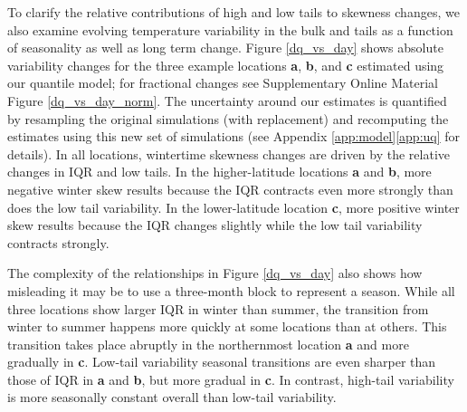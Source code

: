 \documentclass{ametsoc}
\begin{document}
To clarify the relative contributions of high and low tails to skewness changes, we 
also examine evolving temperature variability in the bulk and tails as a function of seasonality as well as long term change. 
Figure \ref{dq_vs_day} shows absolute variability changes 
for the three example locations \textbf{a}, \textbf{b}, and \textbf{c}
estimated using our quantile model; for fractional changes see Supplementary Online Material Figure \ref{dq_vs_day_norm}. The uncertainty around our estimates is quantified by resampling the original simulations (with replacement) and recomputing the estimates using this new set of simulations (see Appendix \ref{app:model}\ref{app:uq} for details). In all locations, wintertime skewness changes are driven by the relative changes in IQR and low tails. In the higher-latitude locations \textbf{a} and \textbf{b}, more negative winter skew results because the IQR contracts even more strongly than does the low tail variability. %
In the lower-latitude location \textbf{c}, more positive winter skew results because the IQR changes slightly while the low tail variability contracts strongly. 


%



The complexity of the relationships in Figure \ref{dq_vs_day} also shows how misleading it may be to use a three-month block to represent a season. While all three locations show larger IQR in winter than summer, the transition from winter to summer happens more quickly at some locations than at others. This transition takes place abruptly in the northernmost location \textbf{a} and more gradually in \textbf{c}. Low-tail variability seasonal transitions are even sharper than those of IQR in \textbf{a} and \textbf{b}, but more gradual in \textbf{c}.
In contrast, high-tail variability is more seasonally constant overall than low-tail variability. 
\end{document}
